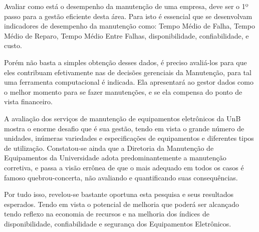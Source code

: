 Avaliar como está o desempenho da manutenção de uma empresa, deve ser o 1º passo para a gestão eficiente desta área. Para isto é essencial que se desenvolvam indicadores de desempenho da manutenção como: Tempo Médio de Falha, Tempo Médio de Reparo, Tempo Médio Entre Falhas, disponibilidade, confiabilidade, e custo.

Porém não basta a simples obtenção desses dados, é preciso avaliá-los para que eles contribuam efetivamente nas de decisões gerenciais da Manutenção, para tal uma ferramenta computacional é indicada. Ela apresentará ao gestor dados como o melhor momento para se fazer manutenções, e se ela compensa do ponto de vista financeiro.

A avaliação dos serviços de manutenção de equipamentos eletrônicos da UnB mostra o enorme desafio que é sua gestão, tendo em vista o grande número de unidades, inúmeras variedades e especificações de equipamentos e diferentes tipos de utilização. Constatou-se ainda que a Diretoria da Manutenção de Equipamentos da Universidade adota predominantemente a manutenção corretiva, e passa a visão errônea de que o mais adequado em todos os casos é famoso quebrou-concerta, não avaliando e quantificando suas consequências.

Por tudo isso, revelou-se bastante oportuna esta pesquisa e seus resultados esperados. Tendo em vista o potencial de melhoria que poderá ser alcançado tendo reflexo na economia de recursos e na melhoria dos índices de disponibilidade, confiabilidade e segurança dos Equipamentos Eletrônicos.




